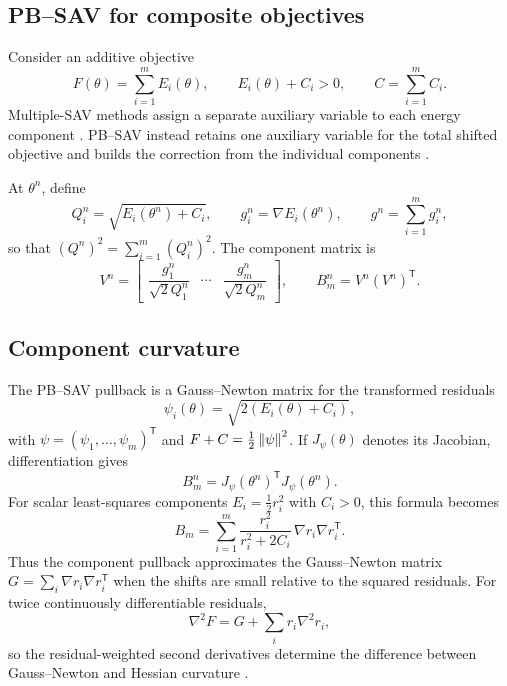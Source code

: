 \subsection{PB--SAV for composite objectives}

Consider an additive objective
\begin{equation}
  F(\theta)=\sum_{i=1}^{m}E_i(\theta),
  \qquad
  E_i(\theta)+C_i>0,
  \qquad
  C=\sum_{i=1}^{m}C_i.
  \label{eq:component-decomposition}
\end{equation}
Multiple-SAV methods assign a separate auxiliary variable to each energy
component \cite{cheng2018msav}. PB--SAV instead retains one auxiliary variable
for the total shifted objective and builds the correction from the individual
components \cite{zhang2026pbsav}.

At \(\theta^n\), define
\begin{equation}
  Q_i^n=\sqrt{E_i(\theta^n)+C_i},
  \qquad
  g_i^n=\nabla E_i(\theta^n),
  \qquad
  g^n=\sum_{i=1}^{m}g_i^n,
  \label{eq:component-notation-preview}
\end{equation}
so that \((Q^n)^2=\sum_{i=1}^{m}(Q_i^n)^2\). The component matrix is
\begin{equation}
  V^n=
  \begin{bmatrix}
  \dfrac{g_1^n}{\sqrt{2}Q_1^n}
  &\cdots&
  \dfrac{g_m^n}{\sqrt{2}Q_m^n}
  \end{bmatrix},
  \qquad
  B_m^n=V^n(V^n)^{\mathsf T}.
  \label{eq:pbsav-preview}
\end{equation}

\subsection{Component curvature}
\label{sec:recalled-geometry}

The PB--SAV pullback is a Gauss--Newton matrix for the transformed residuals
\cite{zhang2026pbsav}
\begin{equation}
  \psi_i(\theta)=\sqrt{2(E_i(\theta)+C_i)},
\end{equation}
with \(\psi=(\psi_1,\ldots,\psi_m)^{\mathsf T}\) and
\(F+C=\tfrac12\left\lVert\psi\right\rVert^2\). If \(J_\psi(\theta)\) denotes its Jacobian,
differentiation gives
\begin{equation}
  B_m^n=J_\psi(\theta^n)^{\mathsf T}J_\psi(\theta^n).
  \label{eq:background-pullback-gn}
\end{equation}
For scalar least-squares components \(E_i=\tfrac12 r_i^2\) with \(C_i>0\),
this formula becomes
\begin{equation}
  B_m
  =\sum_{i=1}^m
  \frac{r_i^2}{r_i^2+2C_i}\,
  \nabla r_i\nabla r_i^{\mathsf T}.
  \label{eq:residual-pullback-curvature}
\end{equation}
Thus the component pullback approximates the Gauss--Newton matrix
\(G=\sum_i\nabla r_i\nabla r_i^{\mathsf T}\) when the shifts are small
relative to the squared residuals. For twice continuously differentiable
residuals,
\begin{equation}
  \nabla^2F=G+\sum_i r_i\nabla^2r_i,
  \label{eq:least-squares-hessian}
\end{equation}
so the residual-weighted second derivatives determine the difference between
Gauss--Newton and Hessian curvature \cite{bjorck1996least}.

